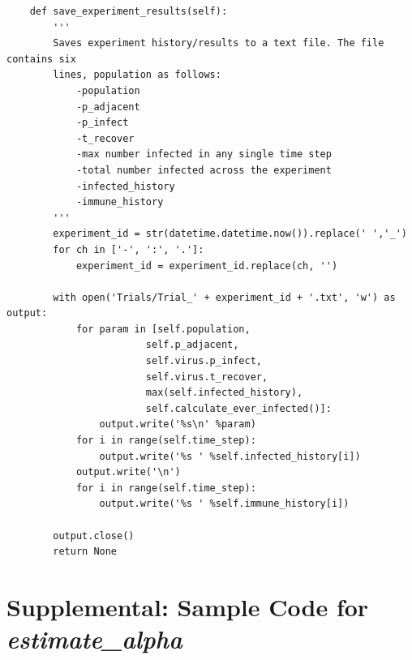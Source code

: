 \documentclass[psamsfonts]{amsart}
\theoremstyle{definition}
\theoremstyle{remark}
\numberwithin{equation}{section}
\begin{document}
\begin{verbatim}
    def save_experiment_results(self):
        '''
        Saves experiment history/results to a text file. The file contains six
        lines, population as follows:
            -population
            -p_adjacent
            -p_infect
            -t_recover
            -max number infected in any single time step
            -total number infected across the experiment
            -infected_history
            -immune_history
        '''
        experiment_id = str(datetime.datetime.now()).replace(' ','_')
        for ch in ['-', ':', '.']:
            experiment_id = experiment_id.replace(ch, '')

        with open('Trials/Trial_' + experiment_id + '.txt', 'w') as output:
            for param in [self.population,
                        self.p_adjacent,
                        self.virus.p_infect,
                        self.virus.t_recover,
                        max(self.infected_history),
                        self.calculate_ever_infected()]:
                output.write('%s\n' %param)
            for i in range(self.time_step):
                output.write('%s ' %self.infected_history[i])
            output.write('\n')
            for i in range(self.time_step):
                output.write('%s ' %self.immune_history[i])

        output.close()
        return None

\end{verbatim}

\pagebreak

\section{Supplemental: Sample Code for \textit{estimate\_alpha}}
\end{document}
